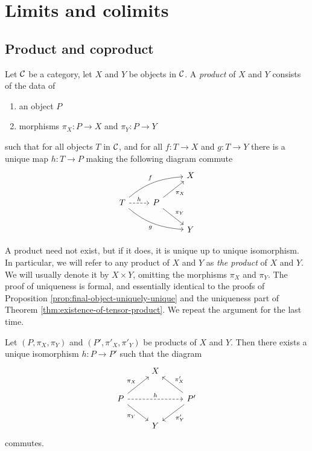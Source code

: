 
\chapter{Limits and colimits}\label{chapter:limits-and-colimits}





\section{Product and coproduct}

\begin{definition}
Let ${\mathcal{C}}$ be a category, let $X$ and $Y$ be objects in ${\mathcal{C}}$.  A \emph{product} of $X$ and $Y$
consists of the data of
\begin{enumerate}
\item an object $P$
\item  morphisms $\pi_X\colon P \to X$ and $\pi_Y\colon P \to Y$
\end{enumerate}
such that for all objects $T$ in ${\mathcal{C}}$, and for all $f\colon T\to X$ and $g\colon T\to Y$ there is a unique map $h\colon T \to P$ making the following diagram commute
\[
\begin{tikzcd}
& & X \\
T \arrow[out=40,in=185]{rru}{f} \arrow[out=-40,in=175,swap]{rrd}{g} \arrow[dashed]{r}{h}
	& P \arrow[swap]{ru}{\pi_X} \arrow{rd}{\pi_Y} & \\
& & Y 
\end{tikzcd}
\]
\end{definition}

A product need not exist, but if it does, it is unique up to unique isomorphism. In particular, we will refer to any product of $X$ and $Y$ as \emph{the product} of $X$ and $Y$. We will usually denote it by $X\times Y$, omitting the morphisms $\pi_X$ and $\pi_Y$. The proof of uniqueness is formal, and essentially identical to the proofs of Proposition  \ref{prop:final-object-uniquely-unique} and the uniqueness part of Theorem
\ref{thm:existence-of-tensor-product}. We repeat the argument for the last time.

\begin{proposition}\label{prop:product-uniquely-unique}
Let $(P,\pi_X,\pi_Y)$ and $(P',\pi'_X,\pi'_Y)$ be products of $X$ and $Y$. Then there exists a unique isomorphism $h\colon P \to P'$ such that the diagram
\[
\begin{tikzcd}
& X & \\
P \arrow{ru}{\pi_X} \arrow[swap]{rd}{\pi_Y} \arrow[dashed]{rr}{h}
	 & &  P' \arrow[swap]{lu}{\pi'_X} \arrow{ld}{\pi'_Y} \\
& Y &
\end{tikzcd}
\]
commutes.
\end{proposition}


